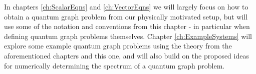 In chapters \ref{ch:ScalarEqns} and \ref{ch:VectorEqns} we will largely focus on how to obtain a quantum graph problem from our physically motivated setup, but will use some of the notation and conventions from this chapter - in particular when defining quantum graph problems themselves.
Chapter \ref{ch:ExampleSystems} will explore some example quantum graph problems using the theory from the aforementioned chapters and this one, and will also build on the proposed ideas for numerically determining the spectrum of a quantum graph problem.